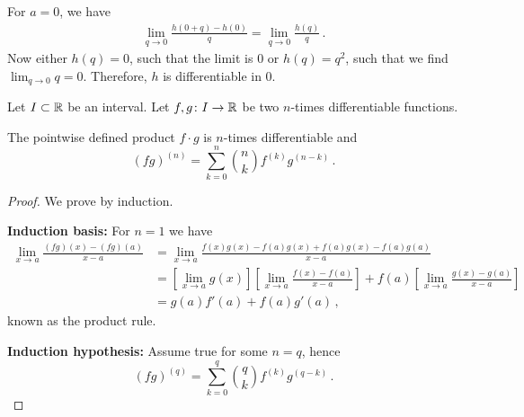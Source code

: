 \documentclass[week=6]{homework}
\begin{document}
\begin{questions}
\begin{parts}
	        For $a = 0$, we have
	        \begin{align*}
	        	\lim_{q\to 0} \frac{h(0+q)-h(0)}{q} = \lim_{q\to 0} \frac{h(q)}{q}\,.
	        \end{align*}
	        Now either $h(q) = 0$, such that the limit is $0$ or $h(q) = q^2$, such that we find $\lim_{q\to 0} q = 0$. Therefore, $h$ is differentiable in $0$.
        \end{parts}
        
        \question
        Let $I \subset \mathbb{R}$ be an interval. Let $f,g \colon I \to \mathbb{R}$ be two $n$-times differentiable functions.
        \begin{toprove}
        	The pointwise defined product $f\cdot g$ is $n$-times differentiable and
        	\[
	        	(fg)^{(n)} = \sum_{k=0}^{n} {n\choose k} f^{(k)}g^{(n-k)}\,.
        	\]
        \end{toprove}
	    \begin{proof}
	    	We prove by induction.
	    	
	    	\textbf{Induction basis:}
	    	For $n=1$ we have
	    	\begin{align*}
	    		\lim_{x\to a} \frac{(fg)(x)-(fg)(a)}{x-a} &= \lim_{x\to a} \frac{f(x)g(x)-f(a)g(x)+f(a)g(x)-f(a)g(a)}{x-a} \\
	    		&= \left[ \lim_{x\to a}g(x) \right] \left[ \lim_{x\to a} \frac{f(x)-f(a)}{x-a} \right] + f(a) \left[ \lim_{x\to a} \frac{g(x)-g(a)}{x-a} \right] \\
	    		&= g(a)f'(a)+f(a)g'(a)\,,
	    	\end{align*}
	    	known as the product rule.
	    	
	    	\textbf{Induction hypothesis:}
	    	Assume true for some $n=q$, hence
	    	\[
		    	(fg)^{(q)} = \sum_{k=0}^{q} {q\choose k} f^{(k)}g^{(q-k)}\,.
	    	\]
	    	

\end{proof}
\end{questions}
\end{document}
